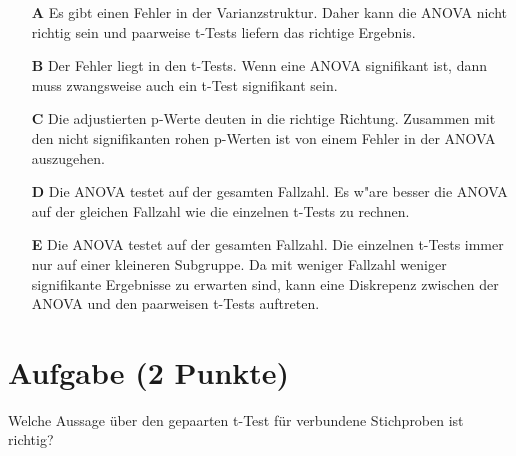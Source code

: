 \documentclass[a4paper, 10pt]{scrartcl}\usepackage[]{graphicx}\usepackage[]{xcolor}
\begin{document}
\begin{enumerate}
\item [\textbf{A} \msquare] Es gibt einen Fehler in der Varianzstruktur. Daher kann die ANOVA nicht richtig sein und paarweise t-Tests liefern das richtige Ergebnis.
\item [\textbf{B} \msquare] Der Fehler liegt in den t-Tests. Wenn eine ANOVA signifikant ist, dann muss zwangsweise auch ein t-Test signifikant sein.
\item [\textbf{C} \msquare] Die adjustierten p-Werte deuten in die richtige Richtung. Zusammen mit den nicht signifikanten rohen p-Werten ist von einem Fehler in der ANOVA auszugehen.
\item [\textbf{D} \msquare] Die ANOVA testet auf der gesamten Fallzahl. Es w{"a}re besser die ANOVA auf der gleichen Fallzahl wie die einzelnen t-Tests zu rechnen.
\item [\textbf{E} \msquare] Die ANOVA testet auf der gesamten Fallzahl. Die einzelnen t-Tests immer nur auf einer kleineren Subgruppe. Da mit weniger Fallzahl weniger signifikante Ergebnisse zu erwarten sind, kann eine Diskrepenz zwischen der ANOVA und den paarweisen t-Tests auftreten.
\end{enumerate} 

\section{Aufgabe \hfill (2 Punkte)}

Welche Aussage {\"u}ber den gepaarten t-Test f{\"u}r verbundene Stichproben ist richtig?
\end{document}
